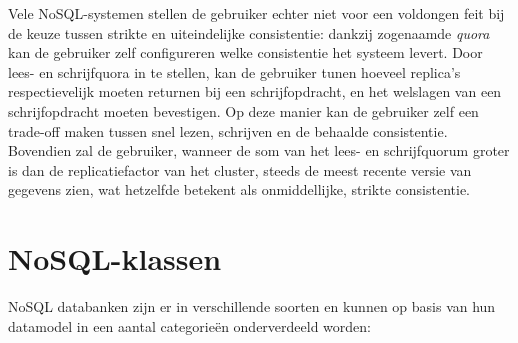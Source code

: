 Vele NoSQL-systemen stellen de gebruiker echter niet voor een voldongen feit bij de keuze tussen strikte en uiteindelijke consistentie: dankzij zogenaamde \textit{quora} kan de gebruiker zelf configureren welke consistentie het systeem levert. Door lees- en schrijfquora in te stellen, kan de gebruiker tunen hoeveel replica's respectievelijk moeten returnen bij een schrijfopdracht, en het welslagen van een schrijfopdracht moeten bevestigen. Op deze manier kan de gebruiker zelf een trade-off maken tussen snel lezen, schrijven en de behaalde consistentie. Bovendien zal de gebruiker, wanneer de som van het lees- en schrijfquorum groter is dan de replicatiefactor van het cluster, steeds de meest recente versie van gegevens zien, wat hetzelfde betekent als onmiddellijke, strikte consistentie.

\section{NoSQL-klassen}

NoSQL databanken zijn er in verschillende soorten en kunnen op basis van hun datamodel in een aantal categorie\"en onderverdeeld worden:

